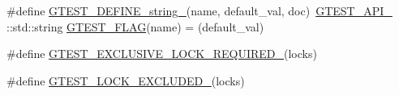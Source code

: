\begin{DoxyCompactItemize}
$$\item 
\#define \hyperlink{gtest-port_8h_a885e18fe217a6e85553d408b99252c12}{G\+T\+E\+S\+T\+\_\+\+D\+E\+F\+I\+N\+E\+\_\+string\+\_\+}(name,  default\+\_\+val,  doc)~\hyperlink{gtest-port_8h_aa73be6f0ba4a7456180a94904ce17790}{G\+T\+E\+S\+T\+\_\+\+A\+P\+I\+\_\+} \+::std\+::string \hyperlink{gtest-port_8h_a828f4e34a1c4b510da50ec1563e3562a}{G\+T\+E\+S\+T\+\_\+\+F\+L\+AG}(name) = (default\+\_\+val)
\item 
\#define \hyperlink{gtest-port_8h_a149f693bd59fa1bc937af54c0cdcb32f}{G\+T\+E\+S\+T\+\_\+\+E\+X\+C\+L\+U\+S\+I\+V\+E\+\_\+\+L\+O\+C\+K\+\_\+\+R\+E\+Q\+U\+I\+R\+E\+D\+\_\+}(locks)
\item 
\#define \hyperlink{gtest-port_8h_a69abff5a4efdd07bd5faebe3dd318d06}{G\+T\+E\+S\+T\+\_\+\+L\+O\+C\+K\+\_\+\+E\+X\+C\+L\+U\+D\+E\+D\+\_\+}(locks)
\end{DoxyCompactItemize}
